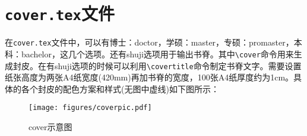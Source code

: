 \section{{\tt cover.tex}文件}
在{\tt cover.tex}文件中，可以有博士：doctor，学硕：master，专硕：promaster，本科：bachelor，这几个选项。还有shuji选项用于输出书脊。其中{\tt \textbackslash cover}命令用来生成封皮。在有shuji选项的时候可以利用{\tt \textbackslash covertitle}命令制定书脊文字。需要设置纸张高度为两张A4纸宽度(420mm)再加书脊的宽度，100张A4纸厚度约为1cm。具体的各个封皮的配色方案和样式(无图中虚线)如下图所示：
\begin{figure}[htbp]
    \centering\texttt{[image: figures/coverpic.pdf]}
    \caption[cover示意图]{cover示意图}
\end{figure}
